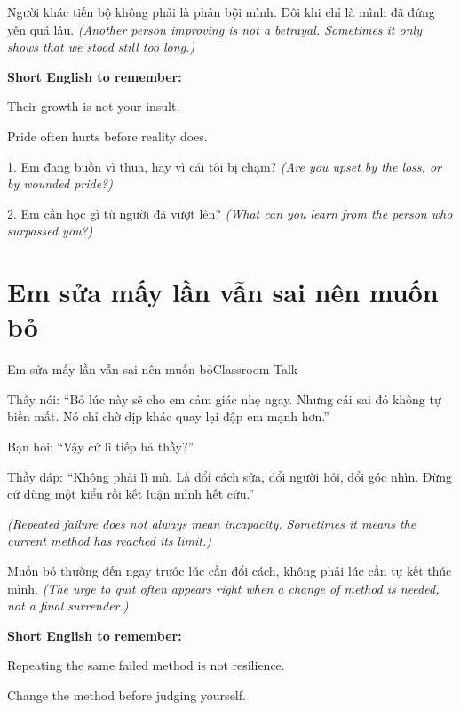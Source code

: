 \begin{baihoc}
Người khác tiến bộ không phải là phản bội mình. Đôi khi chỉ là mình đã đứng yên quá lâu.
\textit{(Another person improving is not a betrayal. Sometimes it only shows that we stood still too long.)}
\end{baihoc}

\begin{ghinhoanh}
\textbf{Short English to remember:}

Their growth is not your insult.

Pride often hurts before reality does.
\end{ghinhoanh}

\begin{tuhocnhanh}
1. Em đang buồn vì thua, hay vì cái tôi bị chạm? \textit{(Are you upset by the loss, or by wounded pride?)}

2. Em cần học gì từ người đã vượt lên? \textit{(What can you learn from the person who surpassed you?)}
\end{tuhocnhanh}
\ngancach

\section{Em sửa mấy lần vẫn sai nên muốn bỏ}
\begin{truyen}{Em sửa mấy lần vẫn sai nên muốn bỏ}{Classroom Talk}

Thầy nói: ``Bỏ lúc này sẽ cho em cảm giác nhẹ ngay. Nhưng cái sai đó không tự biến mất. Nó chỉ chờ dịp khác quay lại đập em mạnh hơn.''

Bạn hỏi: ``Vậy cứ lì tiếp hả thầy?''

Thầy đáp: ``Không phải lì mù. Là đổi cách sửa, đổi người hỏi, đổi góc nhìn. Đừng cứ dùng một kiểu rồi kết luận mình hết cứu.''

\textit{(Repeated failure does not always mean incapacity. Sometimes it means the current method has reached its limit.)}
\end{truyen}

\begin{baihoc}
Muốn bỏ thường đến ngay trước lúc cần đổi cách, không phải lúc cần tự kết thúc mình.
\textit{(The urge to quit often appears right when a change of method is needed, not a final surrender.)}
\end{baihoc}

\begin{ghinhoanh}
\textbf{Short English to remember:}

Repeating the same failed method is not resilience.

Change the method before judging yourself.
\end{ghinhoanh}

